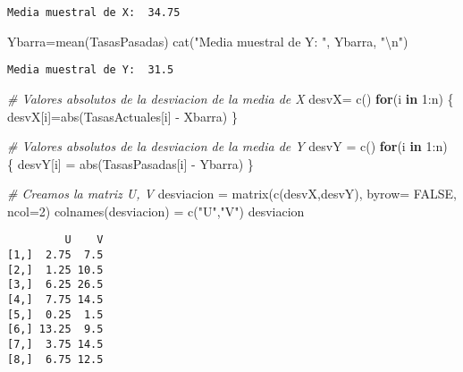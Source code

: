 \documentclass[
  a4paper,
  oneside,
  openany]{book}
\newenvironment{Shaded}{\begin{snugshade}}{\end{snugshade}}
\newcommand{\AttributeTok}[1]{\textcolor[rgb]{0.77,0.63,0.00}{#1}}
\newcommand{\CommentTok}[1]{\textcolor[rgb]{0.56,0.35,0.01}{\textit{#1}}}
\newcommand{\ConstantTok}[1]{\textcolor[rgb]{0.00,0.00,0.00}{#1}}
\newcommand{\ControlFlowTok}[1]{\textcolor[rgb]{0.13,0.29,0.53}{\textbf{#1}}}
\newcommand{\DecValTok}[1]{\textcolor[rgb]{0.00,0.00,0.81}{#1}}
\newcommand{\FunctionTok}[1]{\textcolor[rgb]{0.00,0.00,0.00}{#1}}
\newcommand{\NormalTok}[1]{#1}
\newcommand{\OtherTok}[1]{\textcolor[rgb]{0.56,0.35,0.01}{#1}}
\newcommand{\SpecialCharTok}[1]{\textcolor[rgb]{0.00,0.00,0.00}{#1}}
\newcommand{\StringTok}[1]{\textcolor[rgb]{0.31,0.60,0.02}{#1}}
\begin{document}
\begin{verbatim}
Media muestral de X:  34.75 
\end{verbatim}

\begin{Shaded}
\begin{Highlighting}[]
\NormalTok{Ybarra}\OtherTok{=}\FunctionTok{mean}\NormalTok{(TasasPasadas)}
\FunctionTok{cat}\NormalTok{(}\StringTok{"Media muestral de Y: "}\NormalTok{, Ybarra, }\StringTok{"}\SpecialCharTok{\textbackslash{}n}\StringTok{"}\NormalTok{)}
\end{Highlighting}
\end{Shaded}

\begin{verbatim}
Media muestral de Y:  31.5 
\end{verbatim}

\begin{Shaded}
\begin{Highlighting}[]
\CommentTok{\# Valores absolutos de la desviacion de la media de X}
\NormalTok{desvX}\OtherTok{=} \FunctionTok{c}\NormalTok{()}
\ControlFlowTok{for}\NormalTok{(i }\ControlFlowTok{in} \DecValTok{1}\SpecialCharTok{:}\NormalTok{n) \{}
\NormalTok{  desvX[i]}\OtherTok{=}\FunctionTok{abs}\NormalTok{(TasasActuales[i] }\SpecialCharTok{{-}}\NormalTok{ Xbarra)}
\NormalTok{\}}

\CommentTok{\# Valores absolutos de la desviacion de la media de Y}
\NormalTok{desvY }\OtherTok{=} \FunctionTok{c}\NormalTok{()}
\ControlFlowTok{for}\NormalTok{(i }\ControlFlowTok{in} \DecValTok{1}\SpecialCharTok{:}\NormalTok{n) \{}
\NormalTok{  desvY[i] }\OtherTok{=} \FunctionTok{abs}\NormalTok{(TasasPasadas[i] }\SpecialCharTok{{-}}\NormalTok{ Ybarra)}
\NormalTok{\}}

\CommentTok{\# Creamos la matriz U, V}
\NormalTok{desviacion }\OtherTok{=} \FunctionTok{matrix}\NormalTok{(}\FunctionTok{c}\NormalTok{(desvX,desvY), }\AttributeTok{byrow=} \ConstantTok{FALSE}\NormalTok{, }\AttributeTok{ncol=}\DecValTok{2}\NormalTok{)}
\FunctionTok{colnames}\NormalTok{(desviacion) }\OtherTok{=} \FunctionTok{c}\NormalTok{(}\StringTok{"U"}\NormalTok{,}\StringTok{"V"}\NormalTok{)}
\NormalTok{desviacion}
\end{Highlighting}
\end{Shaded}

\begin{verbatim}
         U    V
[1,]  2.75  7.5
[2,]  1.25 10.5
[3,]  6.25 26.5
[4,]  7.75 14.5
[5,]  0.25  1.5
[6,] 13.25  9.5
[7,]  3.75 14.5
[8,]  6.75 12.5
\end{verbatim}
\end{document}

